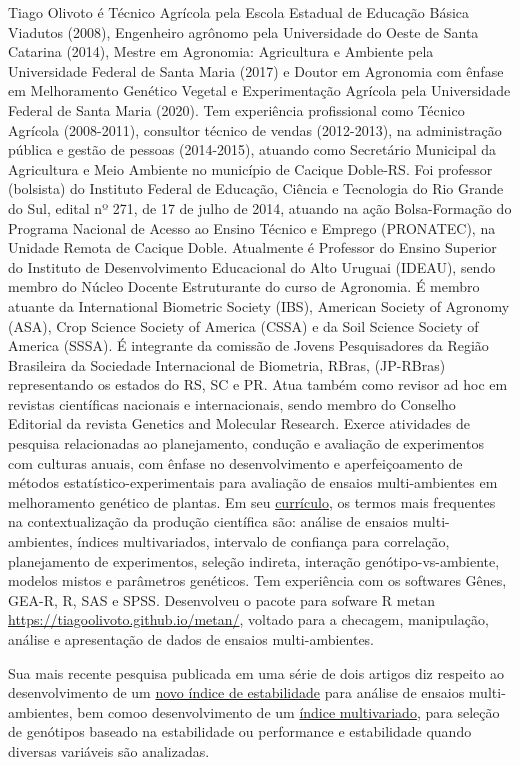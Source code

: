 \documentclass[
]{book}
\begin{document}
Tiago Olivoto é Técnico Agrícola pela Escola Estadual de Educação Básica Viadutos (2008), Engenheiro agrônomo pela Universidade do Oeste de Santa Catarina (2014), Mestre em Agronomia: Agricultura e Ambiente pela Universidade Federal de Santa Maria (2017) e Doutor em Agronomia com ênfase em Melhoramento Genético Vegetal e Experimentação Agrícola pela Universidade Federal de Santa Maria (2020). Tem experiência profissional como Técnico Agrícola (2008-2011), consultor técnico de vendas (2012-2013), na administração pública e gestão de pessoas (2014-2015), atuando como Secretário Municipal da Agricultura e Meio Ambiente no município de Cacique Doble-RS. Foi professor (bolsista) do Instituto Federal de Educação, Ciência e Tecnologia do Rio Grande do Sul, edital nº 271, de 17 de julho de 2014, atuando na ação Bolsa-Formação do Programa Nacional de Acesso ao Ensino Técnico e Emprego (PRONATEC), na Unidade Remota de Cacique Doble. Atualmente é Professor do Ensino Superior do Instituto de Desenvolvimento Educacional do Alto Uruguai (IDEAU), sendo membro do Núcleo Docente Estruturante do curso de Agronomia. É membro atuante da International Biometric Society (IBS), American Society of Agronomy (ASA), Crop Science Society of America (CSSA) e da Soil Science Society of America (SSSA). É integrante da comissão de Jovens Pesquisadores da Região Brasileira da Sociedade Internacional de Biometria, RBras, (JP-RBras) representando os estados do RS, SC e PR. Atua também como revisor ad hoc em revistas científicas nacionais e internacionais, sendo membro do Conselho Editorial da revista Genetics and Molecular Research. Exerce atividades de pesquisa relacionadas ao planejamento, condução e avaliação de experimentos com culturas anuais, com ênfase no desenvolvimento e aperfeiçoamento de métodos estatístico-experimentais para avaliação de ensaios multi-ambientes em melhoramento genético de plantas. Em seu \href{http://buscatextual.cnpq.br/buscatextual/visualizacv.do?id=K4416862T6}{currículo}, os termos mais frequentes na contextualização da produção científica são: análise de ensaios multi-ambientes, índices multivariados, intervalo de confiança para correlação, planejamento de experimentos, seleção indireta, interação genótipo-vs-ambiente, modelos mistos e parâmetros genéticos. Tem experiência com os softwares Gênes, GEA-R, R, SAS e SPSS. Desenvolveu o pacote para sofware R metan \url{https://tiagoolivoto.github.io/metan/}, voltado para a checagem, manipulação, análise e apresentação de dados de ensaios multi-ambientes.

Sua mais recente pesquisa publicada em uma série de dois artigos diz respeito ao desenvolvimento de um \href{https://www.researchgate.net/publication/334635697_Mean_performance_and_stability_in_multi-environment_trials_I_Combining_features_of_AMMI_and_BLUP_techniques}{novo índice de estabilidade} para análise de ensaios multi-ambientes, bem comoo desenvolvimento de um \href{https://www.researchgate.net/publication/334636021_Mean_performance_and_stability_in_multi-environment_trials_II_Selection_based_on_multiple_traits}{índice multivariado}, para seleção de genótipos baseado na estabilidade ou performance e estabilidade quando diversas variáveis são analizadas.
\end{document}
